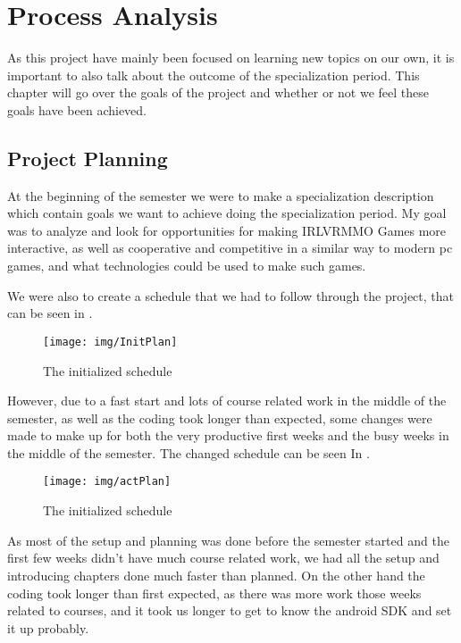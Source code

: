\chapter{Process Analysis}

As this project have mainly been focused on learning new topics on our own, it is important to also talk about the outcome of the specialization period. This chapter will go over the goals of the project and whether or not we feel these goals have been achieved.

\section{Project Planning}
At the beginning of the semester we were to make a specialization description which contain goals we want to achieve doing the specialization period. My goal was to analyze and look for opportunities for making IRLVRMMO Games more interactive, as well as cooperative and competitive in a similar way to modern pc games, and what technologies could be used to make such games.

We were also to create a schedule that we had to follow through the project, that can be seen in .

\begin{figure}[H]
\texttt{[image: img/InitPlan]}
\centering
\caption{The initialized schedule}
\label{fig:InitPlan}
\end{figure}

However, due to a fast start and lots of course related work in the middle of the semester, as well as the coding took longer than expected, some changes were made to make up for both the very productive first weeks and the busy weeks in the middle of the semester. The changed schedule can be seen In .

\begin{figure}[H]
\texttt{[image: img/actPlan]}
\centering
\caption{The initialized schedule}
\label{fig:actPlan}
\end{figure}

As most of the setup and planning was done before the semester started and the first few weeks didn't have much course related work, we had all the setup and introducing chapters done much faster than planned. On the other hand the coding took longer than first expected, as there was more work those weeks related to courses, and it took us longer to get to know the android SDK and set it up probably.


